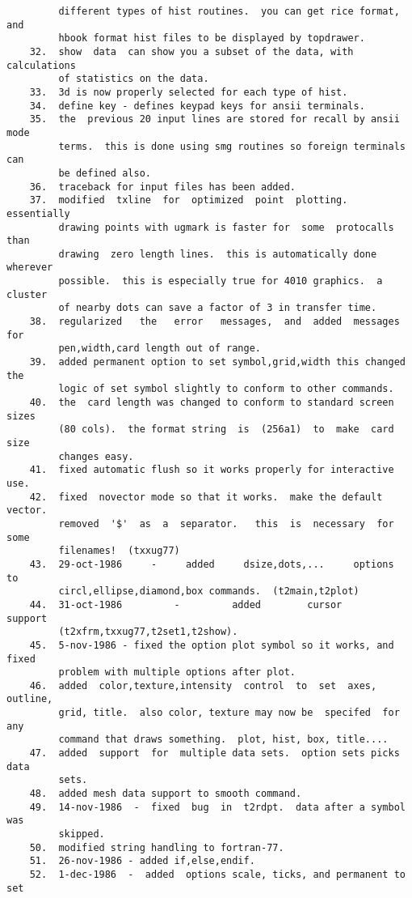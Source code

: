 \begin{verbatim}
         different types of hist routines.  you can get rice format,  and
         hbook format hist files to be displayed by topdrawer.  
    32.  show  data  can show you a subset of the data, with calculations
         of statistics on the data.  
    33.  3d is now properly selected for each type of hist.  
    34.  define key - defines keypad keys for ansii terminals.  
    35.  the  previous 20 input lines are stored for recall by ansii mode
         terms.  this is done using smg routines so foreign terminals can
         be defined also.  
    36.  traceback for input files has been added.  
    37.  modified  txline  for  optimized  point  plotting.   essentially
         drawing points with ugmark is faster for  some  protocalls  than
         drawing  zero length lines.  this is automatically done wherever
         possible.  this is especially true for 4010 graphics.  a cluster
         of nearby dots can save a factor of 3 in transfer time.  
    38.  regularized   the   error   messages,  and  added  messages  for
         pen,width,card length out of range.  
    39.  added permanent option to set symbol,grid,width this changed the
         logic of set symbol slightly to conform to other commands.  
    40.  the  card length was changed to conform to standard screen sizes
         (80 cols).  the format string  is  (256a1)  to  make  card  size
         changes easy.  
    41.  fixed automatic flush so it works properly for interactive use. 
    42.  fixed  novector mode so that it works.  make the default vector.
         removed  '$'  as  a  separator.   this  is  necessary  for  some
         filenames!  (txxug77) 
    43.  29-oct-1986     -     added     dsize,dots,...     options    to
         circl,ellipse,diamond,box commands.  (t2main,t2plot) 
    44.  31-oct-1986         -         added        cursor        support
         (t2xfrm,txxug77,t2set1,t2show).  
    45.  5-nov-1986 - fixed the option plot symbol so it works, and fixed
         problem with multiple options after plot.  
    46.  added  color,texture,intensity  control  to  set  axes, outline,
         grid, title.  also color, texture may now be  specifed  for  any
         command that draws something.  plot, hist, box, title....  
    47.  added  support  for  multiple data sets.  option sets picks data
         sets.  
    48.  added mesh data support to smooth command.  
    49.  14-nov-1986  -  fixed  bug  in  t2rdpt.  data after a symbol was
         skipped.  
    50.  modified string handling to fortran-77.  
    51.  26-nov-1986 - added if,else,endif.  
    52.  1-dec-1986  -  added  options scale, ticks, and permanent to set

\end{verbatim}
